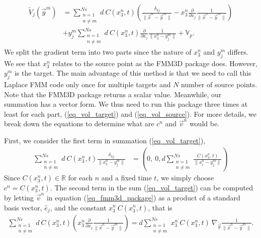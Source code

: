 \begin{align}
	\tilde{V}_j (\vec{y}^m) 
	& = \sum_{\substack{n=1 \\ n \neq m}}^{Ns} 
		d \ {C}(x_3^n, t)
		\left(
			\frac{ \delta_{3j} }{\|\vec{x}^n - \vec{y}^m \|}
			- 
			 x_3^n  
			\frac{\partial}{\partial x_j}
				\frac{1}{\|\vec{x}^n - \vec{y}^m \|}
				\right)
			\label{eq_vol_target} \\
			& +
			   y_j^m  
			\sum_{\substack{n=1 \\ n \neq m}}^{Ns} 
			d \ {C}(x_3^n, t)
			\frac{\partial}{\partial x_j}
				\frac{1}{\|x_3^n - y_j^m \|} + \mathbb{V}_p.
\label{eq_vol_source}
\end{align}
We split the gradient term into two parts since the nature of $x_3^n$ and $y_j^m$ differs. We see that $x_3^n$ relates to the source point as the FMM3D package does. However, $y_j^m$ is the target. 
The main advantage of this method is that we need to call this Laplace FMM code only once for multiple targets and $N$ number of source points. 
Note that the FMM3D package returns a scalar value. Meanwhile, our summation has a vector form. We thus need to run this package three times at least for each part, (\ref{eq_vol_target}) and (\ref{eq_vol_source}). For more details, we break down the equations to determine what are $c^n$ and $\vec{v}^n$ would be.
\par
First, we consider the first term in summation (\ref{eq_vol_target}),
\begin{align}
	\sum_{\substack{n=1 \\ n \neq m}}^{Ns} 
		d \ {C}(x_3^n, t)
			\frac{ \delta_{3j} }{\|x_3^n - y_j^m \|}
	 & = \left(0,\ 0, d 	\sum_{\substack{n=1 \\ n \neq m}}^{Ns}  \frac{ {C}(x_3^n, t)}{ \|x_i^n - y_j^m \|} \right)
\label{eq_vol_part1}
\end{align}
Since ${C}(x_3^n, t)\in \mathbb{R}$ for each $n$ and a fixed time $t$, we simply choose  $c^n =  {C}(x_3^n, t)$. 
The second term in the sum (\ref{eq_vol_target}) can be computed by letting $\vec{v}^n$ in equation (\ref{eq_fmm3d_package}) as a product of a standard basis vector, $\hat{e}_j$, and the constant $x_3^n  \ {C}(x_3^n, t) $, that is
\begin{align}
	\sum_{\substack{n=1 \\ n \neq m}}^{Ns} 
		d \ {C}(x_3^n, t)
		\left(
			 x_3^n  
			\frac{\partial}{\partial x_j}
				\frac{1}{\|\vec{x}^n - \vec{y}^m\|}
				\right) = 
		d \sum_{\substack{n=1 \\ n \neq m}}^{Ns} 
			x_3^n  \ {C}(x_3^n, t) 
			      \
			\nabla_{\vec{y}} 
				\frac{1}{\|\vec{x}^n - \vec{y}^m \|}.
\label{eq_vol_part2}
\end{align}
